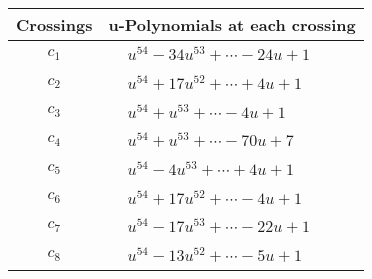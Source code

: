 \documentclass[1p]{elsarticle_modified}
\theoremstyle{definition}
\begin{document}
\begin{tabular}{m{50pt}|m{274pt}}
Crossings & \hspace{64pt}u-Polynomials at each crossing \\
\hline $$\begin{aligned}c_{1}\end{aligned}$$&$\begin{aligned}
&u^{54}-34 u^{53}+\cdots-24 u+1
\end{aligned}$\\
\hline $$\begin{aligned}c_{2}\end{aligned}$$&$\begin{aligned}
&u^{54}+17 u^{52}+\cdots+4 u+1
\end{aligned}$\\
\hline $$\begin{aligned}c_{3}\end{aligned}$$&$\begin{aligned}
&u^{54}+u^{53}+\cdots-4 u+1
\end{aligned}$\\
\hline $$\begin{aligned}c_{4}\end{aligned}$$&$\begin{aligned}
&u^{54}+u^{53}+\cdots-70 u+7
\end{aligned}$\\
\hline $$\begin{aligned}c_{5}\end{aligned}$$&$\begin{aligned}
&u^{54}-4 u^{53}+\cdots+4 u+1
\end{aligned}$\\
\hline $$\begin{aligned}c_{6}\end{aligned}$$&$\begin{aligned}
&u^{54}+17 u^{52}+\cdots-4 u+1
\end{aligned}$\\
\hline $$\begin{aligned}c_{7}\end{aligned}$$&$\begin{aligned}
&u^{54}-17 u^{53}+\cdots-22 u+1
\end{aligned}$\\
\hline $$\begin{aligned}c_{8}\end{aligned}$$&$\begin{aligned}
&u^{54}-13 u^{52}+\cdots-5 u+1
\end{aligned}$\\

\end{tabular}
\end{document}
